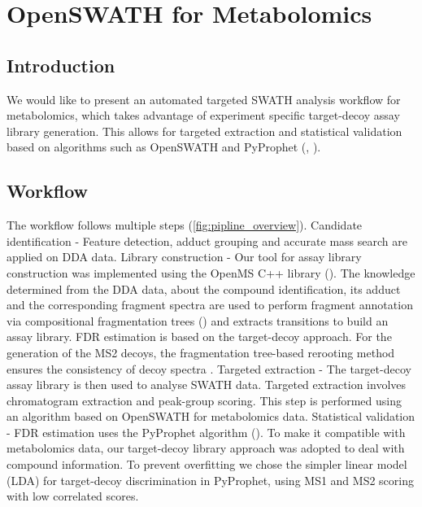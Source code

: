 \section{OpenSWATH for Metabolomics}
\subsection{Introduction}
We would like to present an automated targeted SWATH analysis workflow for metabolomics, which takes advantage of experiment specific target-decoy assay library generation. This allows for targeted extraction and statistical validation based on algorithms such as OpenSWATH and PyProphet (\cite{Rost2014}, \cite{Teleman2015}). 

\subsection{Workflow}

The workflow follows multiple steps (\ref{fig:pipline_overview}). Candidate identification - Feature detection, adduct grouping and accurate mass search are applied on DDA data. Library construction - Our tool for assay library construction was implemented using the OpenMS C++ library (\cite {OpenMS}). The knowledge determined from the DDA data, about the compound identification, its adduct and the corresponding fragment spectra are used to perform fragment annotation via compositional fragmentation trees (\cite{Duhrkop2019}) and extracts transitions to build an assay library. FDR estimation is based on the target-decoy approach. For the generation of the MS2 decoys, the fragmentation tree-based rerooting method ensures the consistency of decoy spectra \cite{Scheubert2017}. Targeted extraction - The target-decoy assay library is then used to analyse SWATH data. Targeted extraction involves chromatogram extraction and peak-group scoring. This step is performed using an algorithm based on OpenSWATH \cite{Rost2014} for metabolomics data. Statistical validation - FDR estimation uses the PyProphet algorithm (\cite{Teleman2015}). To make it compatible with metabolomics data, our target-decoy library approach was adopted to deal with compound information. To prevent overfitting we chose the simpler linear model (LDA) for target-decoy discrimination in PyProphet, using MS1 and MS2 scoring with low correlated scores.

